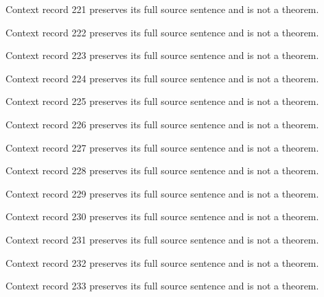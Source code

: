 \documentclass{article}
\begin{document}
\begin{remark}\label{train:context:221}Context record 221 preserves its full source sentence and is not a theorem.\end{remark}
\begin{remark}\label{train:context:222}Context record 222 preserves its full source sentence and is not a theorem.\end{remark}
\begin{remark}\label{train:context:223}Context record 223 preserves its full source sentence and is not a theorem.\end{remark}
\begin{remark}\label{train:context:224}Context record 224 preserves its full source sentence and is not a theorem.\end{remark}
\begin{remark}\label{train:context:225}Context record 225 preserves its full source sentence and is not a theorem.\end{remark}
\begin{remark}\label{train:context:226}Context record 226 preserves its full source sentence and is not a theorem.\end{remark}
\begin{remark}\label{train:context:227}Context record 227 preserves its full source sentence and is not a theorem.\end{remark}
\begin{remark}\label{train:context:228}Context record 228 preserves its full source sentence and is not a theorem.\end{remark}
\begin{remark}\label{train:context:229}Context record 229 preserves its full source sentence and is not a theorem.\end{remark}
\begin{remark}\label{train:context:230}Context record 230 preserves its full source sentence and is not a theorem.\end{remark}
\begin{remark}\label{train:context:231}Context record 231 preserves its full source sentence and is not a theorem.\end{remark}
\begin{remark}\label{train:context:232}Context record 232 preserves its full source sentence and is not a theorem.\end{remark}
\begin{remark}\label{train:context:233}Context record 233 preserves its full source sentence and is not a theorem.\end{remark}
\end{document}
